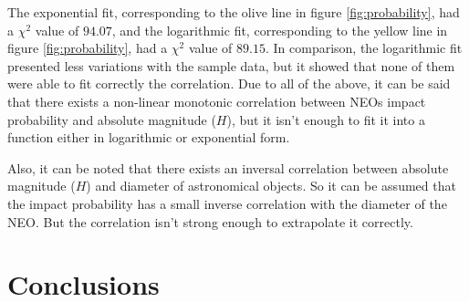 \documentclass[
	a4paper, %
	10pt, %
	unnumberedsections, %
	twoside, %
]{LTJournalArticle}
\begin{document}
The exponential fit, corresponding to the olive line in figure \ref{fig:probability}, had a $\chi^2$
value of $94.07$, and the logarithmic fit, corresponding to the yellow line in figure \ref{fig:probability},
had a $\chi^2$ value of $89.15$. In comparison, the logarithmic fit presented less variations with the
sample data, but it showed that none of them were able to fit correctly the correlation. Due to all of
the above, it can be said that there exists a non-linear monotonic correlation between NEOs impact
probability and absolute magnitude ($H$), but it isn't enough to fit it into a function either in
logarithmic or exponential form.

Also, it can be noted that there exists an inversal correlation between absolute magnitude ($H$) and
diameter of astronomical objects. So it can be assumed that the impact probability has a small inverse
correlation with the diameter of the NEO. But the correlation isn't strong enough to extrapolate it
correctly.


\section{Conclusions}



\printbibliography %

\end{document}
